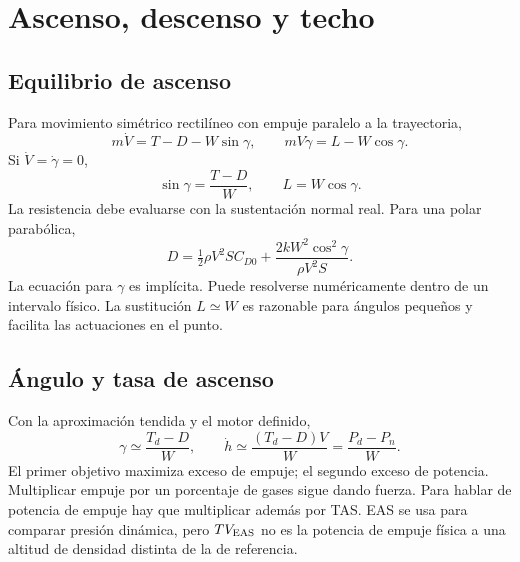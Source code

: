 \chapter{Ascenso, descenso y techo}\label{ch:climb}

\section{Equilibrio de ascenso}
Para movimiento simétrico rectilíneo con empuje paralelo a la trayectoria,
\begin{equation}
m\dot V=T-D-W\sin\gamma,\qquad mV\dot\gamma=L-W\cos\gamma.
\end{equation}
Si $\dot V=\dot\gamma=0$,
\begin{equation}
\sin\gamma=\frac{T-D}{W},\qquad L=W\cos\gamma.\label{eq:climb-exacto}
\end{equation}
La resistencia debe evaluarse con la sustentación normal real. Para una polar parabólica,
\begin{equation}
D=\tfrac12\rho V^2SC_{D0}+\frac{2kW^2\cos^2\gamma}{\rho V^2S}.
\end{equation}
La ecuación para $\gamma$ es implícita. Puede resolverse numéricamente dentro de un intervalo físico. La sustitución $L\simeq W$ es razonable para ángulos pequeños y facilita las actuaciones en el punto.

\section{Ángulo y tasa de ascenso}
Con la aproximación tendida y el motor definido,
\begin{equation}
\gamma\simeq\frac{T_d-D}{W},\qquad
\dot h\simeq\frac{(T_d-D)V}{W}=\frac{P_d-P_n}{W}.
\label{eq:excess}
\end{equation}
El primer objetivo maximiza exceso de empuje; el segundo exceso de potencia. Multiplicar empuje por un porcentaje de gases sigue dando fuerza. Para hablar de potencia de empuje hay que multiplicar además por TAS. EAS se usa para comparar presión dinámica, pero $TV_{\rm EAS}$ no es la potencia de empuje física a una altitud de densidad distinta de la de referencia.


